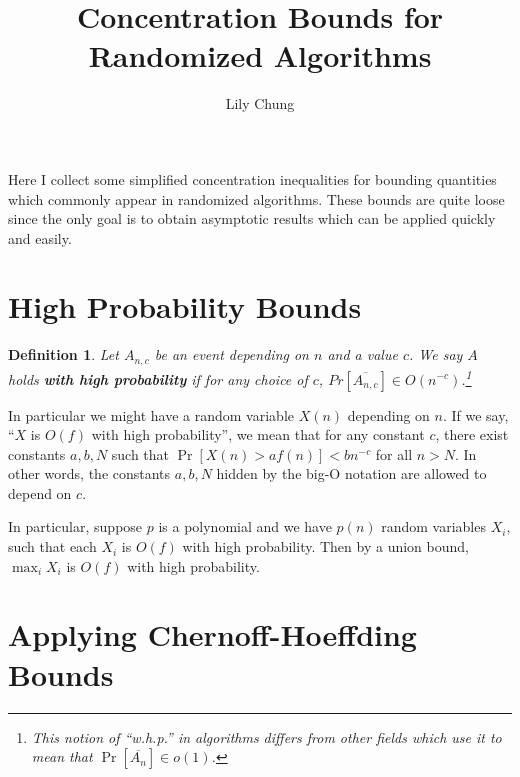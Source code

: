 \documentclass[11pt,a4paper]{article}
\title{Concentration Bounds for Randomized Algorithms}
\author{Lily Chung}
\date{}
\newtheorem{theorem}{Theorem}
\newtheorem{definition}[theorem]{Definition}
\newcommand*{\defn}[1]{\textbf{#1}}
\newcommand*{\E}[0]{\mathbf{E}}
\def\[#1\]{\begin{align*}#1\end{align*}}
\begin{document}
\maketitle

Here I collect some simplified concentration inequalities for bounding quantities which commonly appear in randomized algorithms.
These bounds are quite loose since the only goal is to obtain asymptotic results which can be applied quickly and easily.

\section{High Probability Bounds}

\begin{definition}
  Let \(A_{n, c}\) be an event depending on \(n\) and a value \(c\).
  We say \(A\) holds \defn{with high probability} if
  for any choice of \(c\),
  \(Pr[\overline{A_{n, c}}] \in O(n^{-c})\).\footnote{This notion of ``w.h.p.'' in algorithms differs from other fields which use it to mean that $\Pr[\overline{A_n}] \in o(1)$.}
\end{definition}

In particular we might have a random variable \(X(n)\) depending on \(n\).
If we say, ``\(X\) is \(O(f)\) with high probability'',
we mean that for any constant \(c\), there exist constants \(a, b, N\) such that
\(\Pr[X(n) > af(n)] < bn^{-c}\) for all \(n > N\).
In other words, the constants \(a, b, N\) hidden by the big-O notation are allowed to depend on \(c\).

In particular, suppose \(p\) is a polynomial and we have \(p(n)\) random variables \(X_i\),
such that each \(X_i\) is \(O(f)\) with high probability.
Then by a union bound, \(\max_i X_i\) is \(O(f)\) with high probability.

\section{Applying Chernoff-Hoeffding Bounds}


\end{document}
